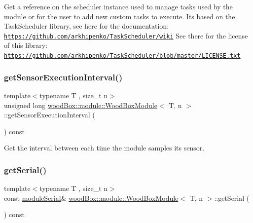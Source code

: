 Get a reference on the scheduler instance used to manage tasks used by the module or for the user to add new custom tasks to execute. It\textquotesingle{}s based on the Task\+Scheduler library, see here for the documentation\+: \href{https://github.com/arkhipenko/TaskScheduler/wiki}{\tt https\+://github.\+com/arkhipenko/\+Task\+Scheduler/wiki} See there for the license of this library\+: \href{https://github.com/arkhipenko/TaskScheduler/blob/master/LICENSE.txt}{\tt https\+://github.\+com/arkhipenko/\+Task\+Scheduler/blob/master/\+L\+I\+C\+E\+N\+S\+E.\+txt} \mbox{\label{classwood_box_1_1module_1_1_wood_box_module_a4d5b8fd2ec5aeacb5704435bb6d961e7}} 
\subsubsection{\texorpdfstring{get\+Sensor\+Execution\+Interval()}{getSensorExecutionInterval()}}
{\footnotesize\ttfamily template$<$typename T , size\+\_\+t n$>$ \\
unsigned long \mbox{\hyperlink{classwood_box_1_1module_1_1_wood_box_module}{wood\+Box\+::module\+::\+Wood\+Box\+Module}}$<$ T, n $>$\+::get\+Sensor\+Execution\+Interval (\begin{DoxyParamCaption}{ }\end{DoxyParamCaption}) const\hspace{0.3cm}{\ttfamily [inline]}}

Get the interval between each time the module samples its sensor. \mbox{\label{classwood_box_1_1module_1_1_wood_box_module_aa8fc11fbebc7904f144bc40b7654a215}} 
\subsubsection{\texorpdfstring{get\+Serial()}{getSerial()}}
{\footnotesize\ttfamily template$<$typename T , size\+\_\+t n$>$ \\
const \mbox{\hyperlink{classwood_box_1_1module_1_1_wood_box_module_a3a6503bbd5147a06ba50081f97177b46}{module\+Serial}}\& \mbox{\hyperlink{classwood_box_1_1module_1_1_wood_box_module}{wood\+Box\+::module\+::\+Wood\+Box\+Module}}$<$ T, n $>$\+::get\+Serial (\begin{DoxyParamCaption}{ }\end{DoxyParamCaption}) const\hspace{0.3cm}{\ttfamily [inline]}}

